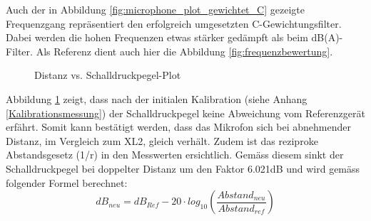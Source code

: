 \documentclass[12pt]{article}
\begin{document}
		\noindent Auch der in Abbildung  \ref{fig:microphone_plot_gewichtet_C} gezeigte Frequenzgang repräsentiert den erfolgreich umgesetzten C-Gewichtungsfilter. Dabei werden die hohen Frequenzen etwas stärker gedämpft als beim dB(A)-Filter. Als Referenz dient auch hier die Abbildung \ref{fig:frequenzbewertung}.
		\begin{figure}[H]
		\centering
			\caption{Distanz vs. Schalldruckpegel-Plot}
			\label{fig:microphone_plot_distanz}
		\end{figure}
	\noindent Abbildung \ref{fig:microphone_plot_distanz} zeigt, dass nach der initialen Kalibration (siehe Anhang \ref{Kalibrationsmessung}) der Schalldruckpegel keine Abweichung vom Referenzgerät erfährt. Somit kann bestätigt werden, dass das Mikrofon sich bei abnehmender Distanz, im Vergleich zum XL2, gleich verhält. Zudem ist das reziproke Abstandsgesetz (\color{green}1/r\color{black}) in den Messwerten ersichtlich. Gemäss diesem sinkt der Schalldruckpegel bei doppelter Distanz um den Faktor 6.021dB und wird gemäss folgender Formel berechnet:
	\begin{equation}\label{eq:Abstandsgesetz}
		dB_{neu} = dB_{Ref} - 20 \cdot log_{10}\left( \frac{Abstand_{neu}}{Abstand_{ref}}\right) 
	\end{equation}
	
	\newpage
\end{document}
